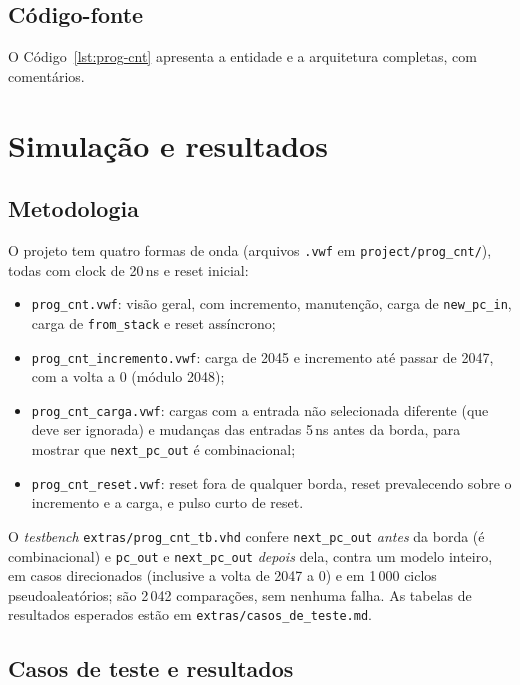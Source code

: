 \subsection{Código-fonte}

O Código~\ref{lst:prog-cnt} apresenta a entidade e a arquitetura completas, com comentários.


\section{Simulação e resultados}

\subsection{Metodologia}

O projeto tem quatro formas de onda (arquivos \texttt{.vwf} em \texttt{project/prog\_cnt/}), todas com clock de 20\,ns e reset inicial:

\begin{itemize}
  \item \texttt{prog\_cnt.vwf}: visão geral, com incremento, manutenção, carga de \texttt{new\_pc\_in}, carga de \texttt{from\_stack} e reset assíncrono;
  \item \texttt{prog\_cnt\_incremento.vwf}: carga de 2045 e incremento até passar de 2047, com a volta a 0 (módulo 2048);
  \item \texttt{prog\_cnt\_carga.vwf}: cargas com a entrada não selecionada diferente (que deve ser ignorada) e mudanças das entradas 5\,ns antes da borda, para mostrar que \texttt{next\_pc\_out} é combinacional;
  \item \texttt{prog\_cnt\_reset.vwf}: reset fora de qualquer borda, reset prevalecendo sobre o incremento e a carga, e pulso curto de reset.
\end{itemize}

O \textit{testbench} \texttt{extras/prog\_cnt\_tb.vhd} confere \texttt{next\_pc\_out} \textit{antes} da borda (é combinacional) e \texttt{pc\_out} e \texttt{next\_pc\_out} \textit{depois} dela, contra um modelo inteiro, em casos direcionados (inclusive a volta de 2047 a 0) e em 1\,000 ciclos pseudoaleatórios; são 2\,042 comparações, sem nenhuma falha. As tabelas de resultados esperados estão em \texttt{extras/casos\_de\_teste.md}.

\subsection{Casos de teste e resultados}


